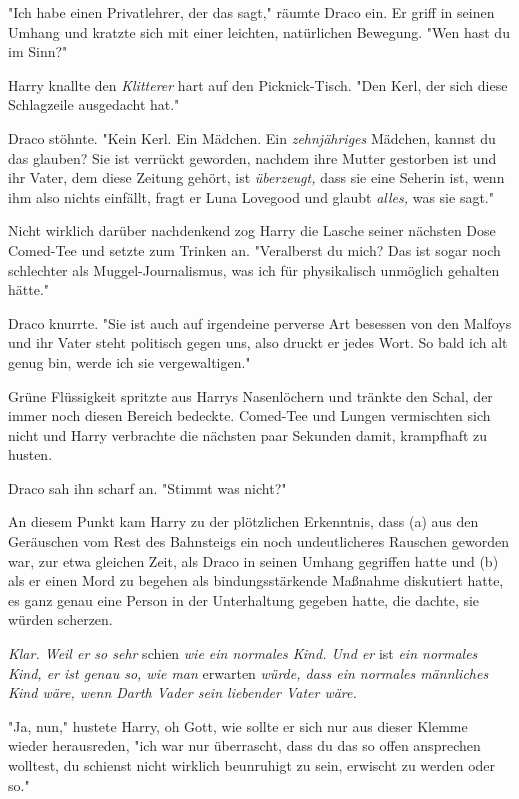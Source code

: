{"Ich habe einen Privatlehrer, der das sagt," räumte Draco ein. Er griff in seinen Umhang und kratzte sich mit einer leichten, natürlichen Bewegung. "Wen hast du im Sinn?"

Harry knallte den \emph{Klitterer} hart auf den Picknick-Tisch. "Den Kerl, der sich diese Schlagzeile ausgedacht hat."

Draco stöhnte. "Kein Kerl. Ein Mädchen. Ein \emph{zehnjähriges} Mädchen, kannst du das glauben? Sie ist verrückt geworden, nachdem ihre Mutter gestorben ist und ihr Vater, dem diese Zeitung gehört, ist \emph{überzeugt,} dass sie eine Seherin ist, wenn ihm also nichts einfällt, fragt er Luna Lovegood und glaubt \emph{alles,} was sie sagt."

Nicht wirklich darüber nachdenkend zog Harry die Lasche seiner nächsten Dose Comed-Tee und setzte zum Trinken an. "Veralberst du mich? Das ist sogar noch schlechter als Muggel-Journalismus, was ich für physikalisch unmöglich gehalten hätte."

Draco knurrte. "Sie ist auch auf irgendeine perverse Art besessen von den Malfoys und ihr Vater steht politisch gegen uns, also druckt er jedes Wort. So bald ich alt genug bin, werde ich sie vergewaltigen."

Grüne Flüssigkeit spritzte aus Harrys Nasenlöchern und tränkte den Schal, der immer noch diesen Bereich bedeckte. Comed-Tee und Lungen vermischten sich nicht und Harry verbrachte die nächsten paar Sekunden damit, krampfhaft zu husten.

Draco sah ihn scharf an. "Stimmt was nicht?"

An diesem Punkt kam Harry zu der plötzlichen Erkenntnis, dass (a) aus den Geräuschen vom Rest des Bahnsteigs ein noch undeutlicheres Rauschen geworden war, zur etwa gleichen Zeit, als Draco in seinen Umhang gegriffen hatte und (b) als er einen Mord zu begehen als bindungsstärkende Maßnahme diskutiert hatte, es ganz genau eine Person in der Unterhaltung gegeben hatte, die dachte, sie würden scherzen.

\emph{Klar. Weil er so sehr} schien \emph{wie ein normales Kind. Und er} ist \emph{ein normales Kind, er ist genau so, wie man} erwarten \emph{würde, dass ein normales männliches Kind wäre, wenn Darth Vader sein liebender Vater wäre.}

"Ja, nun," hustete Harry, oh Gott, wie sollte er sich nur aus dieser Klemme wieder herausreden, "ich war nur überrascht, dass du das so offen ansprechen wolltest, du schienst nicht wirklich beunruhigt zu sein, erwischt zu werden oder so."

}

